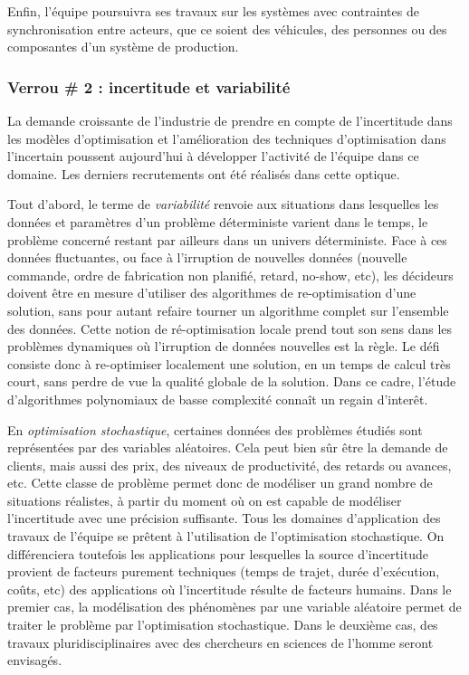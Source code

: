 	Enfin, l'équipe poursuivra ses travaux sur les systèmes avec contraintes de synchronisation entre acteurs, que ce soient des véhicules, des personnes ou des composantes d'un système de production. 
	
	
	\subsubsection*{Verrou \# 2 : incertitude et variabilité}
	
	
	La demande croissante de l'industrie de prendre en compte de l'incertitude dans les modèles d'optimisation et l'amélioration des techniques d'optimisation dans l'incertain  poussent aujourd'hui à développer l'activité de l'équipe dans ce domaine.  Les derniers recrutements ont été réalisés dans cette optique. 
	
	Tout d'abord, le terme  de \textit{variabilité}  renvoie aux situations dans lesquelles les données et paramètres d'un problème déterministe varient dans le temps, le problème concerné restant par ailleurs dans un univers déterministe. Face à ces données fluctuantes, ou face à l'irruption de nouvelles données (nouvelle commande, ordre de fabrication non planifié, retard, no-show, etc), les décideurs doivent être en mesure d'utiliser des algorithmes de re-optimisation d'une solution, sans pour autant refaire tourner un algorithme complet sur l'ensemble des données. Cette notion de ré-optimisation locale prend tout son sens dans les problèmes dynamiques où l'irruption de données nouvelles est la règle. Le défi consiste donc à re-optimiser localement une solution, en un temps de calcul très court, sans perdre de vue la qualité globale de la solution. Dans ce cadre, l'étude d'algorithmes polynomiaux de basse complexité connaît un regain d'interêt. 
	
	
	En \textit{optimisation stochastique}, certaines données des problèmes étudiés sont représentées par des variables aléatoires. 
	Cela peut bien sûr être la demande de clients, mais aussi des prix, des niveaux de productivité, des retards ou avances, etc. 
	Cette classe de problème permet donc de modéliser un grand nombre de situations réalistes, à partir du moment où on est capable de modéliser l'incertitude avec une précision suffisante. 
	Tous les domaines d'application des travaux de l'équipe se prêtent à l'utilisation de l'optimisation stochastique. On différenciera toutefois les applications pour lesquelles la source d'incertitude provient de facteurs purement techniques (temps de trajet, durée d'exécution, coûts, etc) des applications où l'incertitude résulte de facteurs humains. Dans le premier cas, la modélisation des phénomènes par une variable aléatoire permet de traiter le problème par l'optimisation stochastique. Dans le deuxième cas, des travaux pluridisciplinaires avec des chercheurs en sciences de l'homme seront envisagés. 
	
